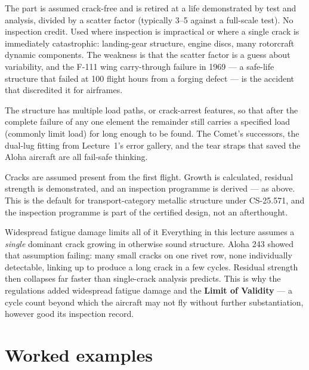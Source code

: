 \documentclass[11pt,a4paper]{article}
\begin{document}
\begin{description}[nosep,leftmargin=0.7cm,style=nextline]
  \item[Safe-life.] The part is assumed crack-free and is retired at a life demonstrated by test and analysis, divided by a scatter factor (typically 3--5 against a full-scale test). No inspection credit. Used where inspection is impractical or where a single crack is immediately catastrophic: landing-gear structure, engine discs, many rotorcraft dynamic components. The weakness is that the scatter factor is a guess about variability, and the F-111 wing carry-through failure in 1969 --- a safe-life structure that failed at 100 flight hours from a forging defect --- is the accident that discredited it for airframes.
  \item[Fail-safe.] The structure has multiple load paths, or crack-arrest features, so that after the complete failure of any one element the remainder still carries a specified load (commonly limit load) for long enough to be found. The Comet's successors, the dual-lug fitting from Lecture~1's error gallery, and the tear straps that saved the Aloha aircraft are all fail-safe thinking.
  \item[Damage tolerance.] Cracks are assumed present from the first flight. Growth is calculated, residual strength is demonstrated, and an inspection programme is derived --- as above. This is the default for transport-category metallic structure under CS-25.571, and the inspection programme is part of the certified design, not an afterthought.
\end{description}

\begin{keybox}{Widespread fatigue damage limits all of it}
Everything in this lecture assumes a \emph{single} dominant crack growing in otherwise sound structure. Aloha 243 showed that assumption failing: many small cracks on one rivet row, none individually detectable, linking up to produce a long crack in a few cycles. Residual strength then collapses far faster than single-crack analysis predicts. This is why the regulations added widespread fatigue damage and the \textbf{Limit of Validity} --- a cycle count beyond which the aircraft may not fly without further substantiation, however good its inspection record.
\end{keybox}

\section{Worked examples}
\end{document}
